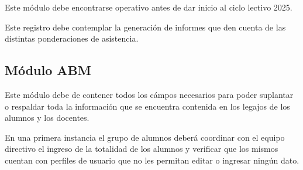 Este módulo debe encontrarse operativo antes de dar inicio al ciclo lectivo 2025.

Este registro debe contemplar la generación de informes que den cuenta de las distintas ponderaciones de asistencia.

\subsection{Módulo ABM}

Este módulo debe de contener todos los cámpos necesarios para poder suplantar o respaldar toda la información que se encuentra contenida en los legajos de los alumnos y los docentes.

En una primera instancia el grupo de alumnos deberá coordinar con el equipo directivo el ingreso de la totalidad de los alumnos y verificar que los mismos cuentan con perfiles de usuario que no les permitan editar o ingresar ningún dato.
